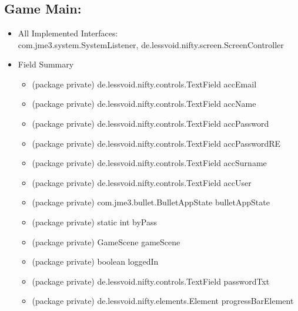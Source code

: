 \documentclass[letterpaper]{article}
\begin{document}
		\newpage
		
		\section*{\colorbox{blue}{}} 
				\vspace{0.1in}
				
					\subsection*{Game Main:}
					\vspace{0.1in}
						
						\begin{itemize}
							\item 	All Implemented Interfaces: \\
									com.jme3.system.SystemListener, de.lessvoid.nifty.screen.ScreenController
							\item	Field Summary
									\begin{itemize}
										\item	(package private) de.lessvoid.nifty.controls.TextField	accEmail 
										\item	(package private) de.lessvoid.nifty.controls.TextField	accName 
										\item	(package private) de.lessvoid.nifty.controls.TextField	accPassword 
										\item	(package private) de.lessvoid.nifty.controls.TextField	accPasswordRE 
										\item	(package private) de.lessvoid.nifty.controls.TextField	accSurname 
										\item	(package private) de.lessvoid.nifty.controls.TextField	accUser 
										\item	(package private) com.jme3.bullet.BulletAppState	bulletAppState 
										\item	(package private) static int	byPass 
										\item	(package private) GameScene	gameScene 
										\item	(package private) boolean	loggedIn 
										\item	(package private) de.lessvoid.nifty.controls.TextField	passwordTxt 
										\item	(package private) de.lessvoid.nifty.elements.Element	progressBarElement 

\end{itemize}
\end{itemize}
\end{document}
